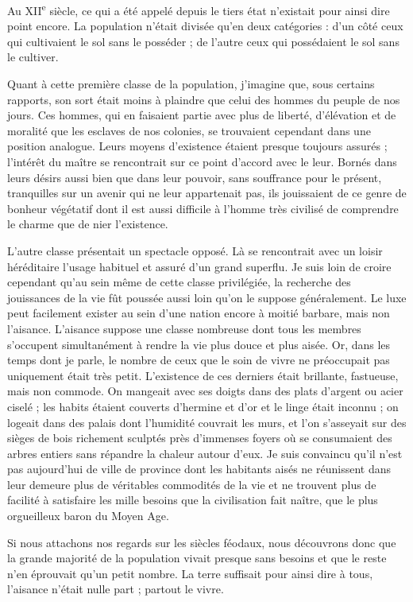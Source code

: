 \documentclass[french,twoside]{book} %
\begin{document}
\noindent Au XII\textsuperscript{e} siècle, ce qui a été appelé depuis le tiers état n’existait pour ainsi dire point encore. La population n’était divisée qu’en deux catégories : d’un côté ceux qui cultivaient le sol sans le posséder ; de l’autre ceux qui possédaient le sol sans le cultiver.\par
Quant à cette première classe de la population, j’imagine que, sous certains rapports, son sort était moins à plaindre que celui des hommes du peuple de nos jours. Ces hommes, qui en faisaient partie avec plus de liberté, d’élévation et de moralité que les esclaves de nos colonies, se trouvaient cependant dans une position analogue. Leurs moyens d’existence étaient presque toujours assurés ; l’intérêt du maître se rencontrait sur ce point d’accord avec le leur. Bornés dans leurs désirs aussi bien que dans leur pouvoir, sans souffrance pour le présent, tranquilles sur un avenir qui ne leur appartenait pas, ils jouissaient de ce genre de bonheur végétatif dont il est aussi difficile à l’homme très civilisé de comprendre le charme que de nier l’existence.\par
L'autre classe présentait un spectacle opposé. Là se rencontrait avec un loisir héréditaire l’usage habituel et assuré d’un grand superflu. Je suis loin de croire cependant qu’au sein même de cette classe privilégiée, la recherche des jouissances de la vie fût poussée aussi loin qu’on le suppose généralement. Le luxe peut facilement exister au sein d’une nation encore à moitié barbare, mais non l’aisance. L'aisance suppose une classe nombreuse dont tous les membres s’occupent simultanément à rendre la vie plus douce et plus aisée. Or, dans les temps dont je parle, le nombre de ceux que le soin de vivre ne préoccupait pas uniquement était très petit. L’existence de ces derniers était brillante, fastueuse, mais non commode. On mangeait avec ses doigts dans des plats d’argent ou acier ciselé ; les habits étaient couverts d’hermine et d’or et le linge était inconnu ; on logeait dans des palais dont l’humidité couvrait les murs, et l’on s’asseyait sur des sièges de bois richement sculptés près d’immenses foyers où se consumaient des arbres entiers sans répandre la chaleur autour d’eux. Je suis convaincu qu’il n’est pas aujourd’hui de ville de province dont les habitants aisés ne réunissent dans leur demeure plus de véritables commodités de la vie et ne trouvent plus de facilité à satisfaire les mille besoins que la civilisation fait naître, que le plus orgueilleux baron du Moyen Age.\par
Si nous attachons nos regards sur les siècles féodaux, nous découvrons donc que la grande majorité de la population vivait presque sans besoins et que le reste n’en éprouvait qu’un petit nombre. La terre suffisait pour ainsi dire à tous, l’aisance n’était nulle part ; partout le vivre.\par
\end{document}
